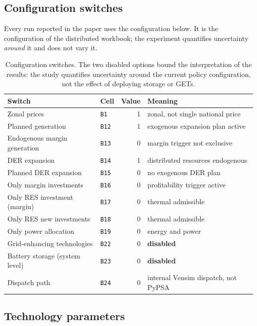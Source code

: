 \documentclass[11pt]{article}
\begin{document}
\subsection{Configuration switches}

Every run reported in the paper uses the configuration below. It is the
configuration of the distributed workbook; the experiment quantifies uncertainty
\emph{around} it and does not vary it.

\begin{table}[htb]
  \centering
  \small
  \begin{tabular}{@{}llrl@{}}
    \toprule
    Switch & Cell & Value & Meaning \\
    \midrule
    Zonal prices & \texttt{B1} & 1 & zonal, not single national price \\
    Planned generation & \texttt{B12} & 1 & exogenous expansion plan active \\
    Endogenous margin generation & \texttt{B13} & 0 & margin trigger not exclusive \\
    DER expansion & \texttt{B14} & 1 & distributed resources endogenous \\
    Planned DER expansion & \texttt{B15} & 0 & no exogenous DER plan \\
    Only margin investments & \texttt{B16} & 0 & profitability trigger active \\
    Only RES investment (margin) & \texttt{B17} & 0 & thermal admissible \\
    Only RES new investments & \texttt{B18} & 0 & thermal admissible \\
    Only power allocation & \texttt{B19} & 0 & energy and power \\
    Grid-enhancing technologies & \texttt{B22} & 0 & \textbf{disabled} \\
    Battery storage (system level) & \texttt{B23} & 0 & \textbf{disabled} \\
    Dispatch path & \texttt{B24} & 0 & internal Vensim dispatch, not PyPSA \\
    \bottomrule
  \end{tabular}
  \caption{Configuration switches. The two disabled options bound the
  interpretation of the results: the study quantifies uncertainty around the
  current policy configuration, not the effect of deploying storage or GETs.}
  \label{tab:sm:switches}
\end{table}

\subsection{Technology parameters}
\end{document}
